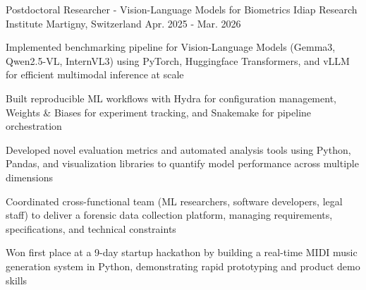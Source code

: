 

\begin{cventries}

\cventry
    {Postdoctoral Researcher - Vision-Language Models for Biometrics} %
    {Idiap Research Institute} %
    {Martigny, Switzerland} %
    {Apr. 2025 - Mar. 2026} %
    {
      \begin{cvitems} %
        \item {Implemented benchmarking pipeline for Vision-Language Models (Gemma3, Qwen2.5-VL, InternVL3) using PyTorch, Huggingface Transformers, and vLLM for efficient multimodal inference at scale}
        \item {Built reproducible ML workflows with Hydra for configuration management, Weights \& Biases for experiment tracking, and Snakemake for pipeline orchestration}
        \item {Developed novel evaluation metrics and automated analysis tools using Python, Pandas, and visualization libraries to quantify model performance across multiple dimensions}
        \item {Coordinated cross-functional team (ML researchers, software developers, legal staff) to deliver a forensic data collection platform, managing requirements, specifications, and technical constraints}
        \item {Won first place at a 9-day startup hackathon by building a real-time MIDI music generation system in Python, demonstrating rapid prototyping and product demo skills}
      \end{cvitems}
    }


\end{cventries}
